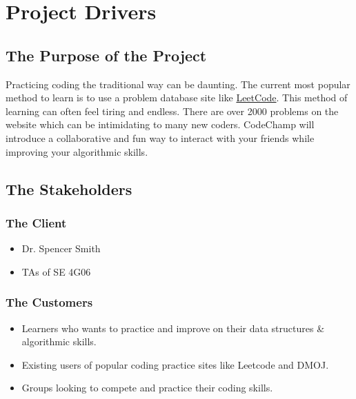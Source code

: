 \documentclass[12pt, titlepage]{article}
\begin{document}
\newpage





\section{Project Drivers}

\subsection{The Purpose of the Project}

Practicing coding the traditional way can be daunting. The current most popular method to learn is to use a problem database site like \href{http://www.leetcode.com}{LeetCode}. This method of learning can often feel tiring and endless. There are over 2000 problems on the website which can be intimidating to many new coders. CodeChamp will introduce a collaborative and fun way to interact with your friends while improving your algorithmic skills.

\subsection{The Stakeholders}

\subsubsection{The Client}
\begin{itemize}
    \item Dr. Spencer Smith
    \item TAs of SE 4G06
\end{itemize}

\subsubsection{The Customers}
\begin{itemize}
    \item Learners who wants to practice and improve on their data structures \& algorithmic skills.
    \item Existing users of popular coding practice sites like Leetcode and DMOJ.
    \item Groups looking to compete and practice their coding skills.
\end{itemize}
\end{document}
